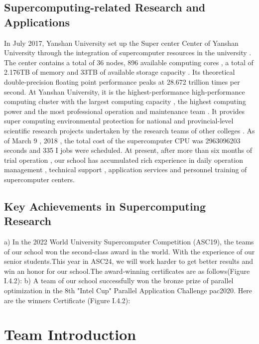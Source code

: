 \documentclass[a4paper,12pt]{article}
\begin{document}
\subsection{Supercomputing-related Research and Applications}
In July 2017, Yanshan University set up the Super center Center of Yanshan University through the integration of supercomputer resources in the university . The center contains a total of 36 nodes, 896 available computing cores , a total of 2.176TB of memory and 33TB of available storage capacity . Its theoretical double-precision floating point performance peaks at 28.672 trillion times per second. At Yanshan University, it is the highest-performance high-performance computing cluster with the largest computing capacity , the highest computing power and the most professional operation and maintenance team . It provides super computing environmental protection for national and provincial-level scientific research projects undertaken by the research teams of other colleges . As of March 9 , 2018 , the total cost of the supercomputer CPU was 2963096203 seconds and 335 I jobs were scheduled. At present, after more than six months of trial operation , our school has accumulated rich experience in daily operation management , technical support , application services and personnel training of supercomputer centers.

\subsection{Key Achievements in Supercomputing Research}
a) In the 2022 World University Supercomputer Competition (ASC19), the teams of our school won the second-class award in the world. With the experience of our senior students.This year in ASC24, we will work harder to get better results and win an honor for our school.The award-winning certificates are as follows(Figure I.4.2):
b) A team of our school successfully won the bronze prize of parallel optimization in the 8th "Intel Cup" Parallel Application Challenge pac2020. Here are the winners Certificate (Figure I.4.2):


\newpage

\section{Team Introduction}
\end{document}
